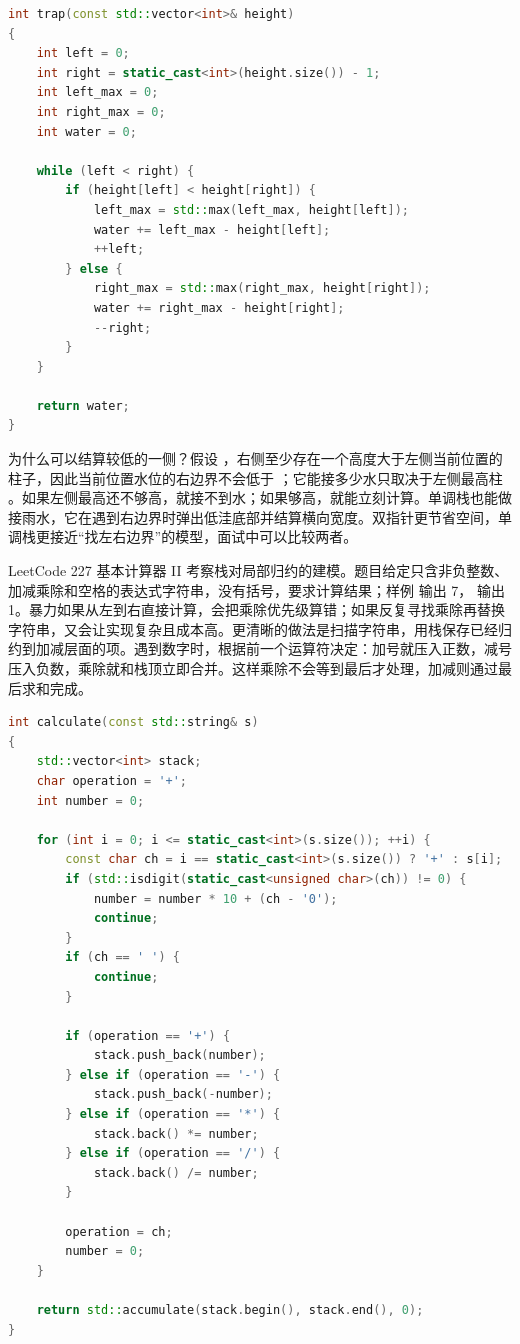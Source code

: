 \begin{lstlisting}[language=C++,caption={LeetCode 42 接雨水：双指针维护两侧最高柱}]
int trap(const std::vector<int>& height)
{
    int left = 0;
    int right = static_cast<int>(height.size()) - 1;
    int left_max = 0;
    int right_max = 0;
    int water = 0;

    while (left < right) {
        if (height[left] < height[right]) {
            left_max = std::max(left_max, height[left]);
            water += left_max - height[left];
            ++left;
        } else {
            right_max = std::max(right_max, height[right]);
            water += right_max - height[right];
            --right;
        }
    }

    return water;
}
\end{lstlisting}

为什么可以结算较低的一侧？假设 ，右侧至少存在一个高度大于左侧当前位置的柱子，因此当前位置水位的右边界不会低于 ；它能接多少水只取决于左侧最高柱 。如果左侧最高还不够高，就接不到水；如果够高，就能立刻计算。单调栈也能做接雨水，它在遇到右边界时弹出低洼底部并结算横向宽度。双指针更节省空间，单调栈更接近“找左右边界”的模型，面试中可以比较两者。

LeetCode 227 基本计算器 II 考察栈对局部归约的建模。题目给定只含非负整数、加减乘除和空格的表达式字符串，没有括号，要求计算结果；样例  输出 7， 输出 1。暴力如果从左到右直接计算，会把乘除优先级算错；如果反复寻找乘除再替换字符串，又会让实现复杂且成本高。更清晰的做法是扫描字符串，用栈保存已经归约到加减层面的项。遇到数字时，根据前一个运算符决定：加号就压入正数，减号压入负数，乘除就和栈顶立即合并。这样乘除不会等到最后才处理，加减则通过最后求和完成。

\begin{lstlisting}[language=C++,caption={LeetCode 227 基本计算器 II：栈处理乘除优先级}]
int calculate(const std::string& s)
{
    std::vector<int> stack;
    char operation = '+';
    int number = 0;

    for (int i = 0; i <= static_cast<int>(s.size()); ++i) {
        const char ch = i == static_cast<int>(s.size()) ? '+' : s[i];
        if (std::isdigit(static_cast<unsigned char>(ch)) != 0) {
            number = number * 10 + (ch - '0');
            continue;
        }
        if (ch == ' ') {
            continue;
        }

        if (operation == '+') {
            stack.push_back(number);
        } else if (operation == '-') {
            stack.push_back(-number);
        } else if (operation == '*') {
            stack.back() *= number;
        } else if (operation == '/') {
            stack.back() /= number;
        }

        operation = ch;
        number = 0;
    }

    return std::accumulate(stack.begin(), stack.end(), 0);
}
\end{lstlisting}

